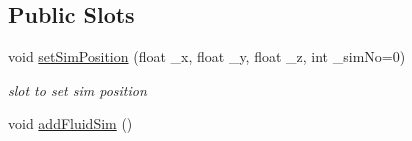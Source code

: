 \subsection*{Public Slots}
\begin{DoxyCompactItemize}
\item 
void \hyperlink{class_open_g_l_widget_a6bc6106c82580697f386fdfd2fdb3a12}{set\-Sim\-Position} (float \-\_\-x, float \-\_\-y, float \-\_\-z, int \-\_\-sim\-No=0)
\begin{DoxyCompactList}\small\item\em slot to set sim position \end{DoxyCompactList}\item 
\hypertarget{class_open_g_l_widget_a9ccb72da15f23a16fb74b270a9e19489}{void \hyperlink{class_open_g_l_widget_a9ccb72da15f23a16fb74b270a9e19489}{add\-Fluid\-Sim} ()}\label{class_open_g_l_widget_a9ccb72da15f23a16fb74b270a9e19489}


\end{DoxyCompactItemize}
